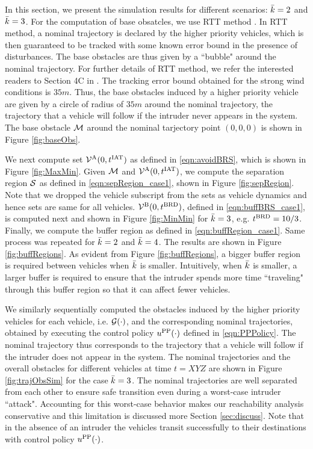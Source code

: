 In this section, we present the simulation results for different scenarios: $\bar{k} = 2$ and $\bar{k} = 3$. For the computation of base obsatcles, we use RTT method \cite{Bansal2017}. In RTT method, a nominal trajectory is declared by the higher priority vehicles, which is then guaranteed to be tracked with some  known error bound in the presence of disturbances. The base obstacles are thus given by a ``bubble" around the nominal trajectory. For further details of RTT method, we refer the interested readers to Section 4C in \cite{Bansal2017}. The tracking error bound obtained for the strong wind conditions is $35m$. Thus, the base obstacles induced by a higher priority vehicle are given by a circle of radius of $35m$ around the nominal trajectory, the trajectory that a vehicle will follow if the intruder never appears in the system. The base obstacle $\mathcal{M}$ around the nominal tarjectory point $(0, 0, 0)$ is shown in Figure \ref{fig:baseObs}. 

We next compute set $\mathcal{V}^{\text{A}}(0, t^\text{IAT})$ as defined in \eqref{eqn:avoidBRS}, which is shown in Figure \ref{fig:MaxMin}. Given $\mathcal{M}$ and $\mathcal{V}^{\text{A}}(0, t^\text{IAT})$, we compute the separation region $\mathcal{S}$ as defined in \eqref{eqn:sepRegion_case1}, shown in Figure \ref{fig:sepRegion}. Note that we dropped the vehicle subscript from the sets as vehicle dynamics and hence sets are same for all vehicles. $\mathcal{V}^{\text{B}}(0, t^\text{BRD})$, defined in \eqref{eqn:buffBRS_case1}, is computed next and shown in Figure \ref{fig:MinMin} for $\bar{k} = 3$, e.g. $t^\text{BRD} = 10/3$. Finally, we compute the buffer region as defined in \eqref{eqn:buffRegion_case1}. Same process was repeated for $\bar{k} = 2$ and $\bar{k} = 4$. The results are shown in Figure \ref{fig:buffRegions}. As evident from Figure \ref{fig:buffRegions}, a bigger buffer region is required between vehicles when $\bar{k}$ is smaller. Intuitively, when $\bar{k}$ is smaller, a larger buffer is required to ensure that the intruder spends more time ``traveling" through this buffer region so that it can affect fewer vehicles.             

We similarly sequentially computed the obstacles induced by the higher priority vehicles for each vehicle, i.e. $\mathcal{G}(\cdot)$, and the corresponding nominal trajectories, obtained by executing the control policy $u^{\text{PP}}(\cdot)$ defined in \eqref{eqn:PPPolicy}. The nominal trajectory thus corresponds to the trajectory that a vehicle will follow if the intruder does not appear in the system. The nominal trajectories and the overall obstacles for different vehicles at time $t = XYZ$ are shown in Figure \ref{fig:trajObsSim} for the case $\bar{k} = 3$. The nominal trajectories are well separated from each other to ensure safe transition even during a worst-case intruder ``attack". Accounting for this worst-case behavior makes our reachability analysis  conservative and this limitation is discussed more Section \ref{sec:discuss}. Note that in the absence of an intruder the vehicles transit successfully to their destinations with control policy $u^{\text{PP}}(\cdot)$.

